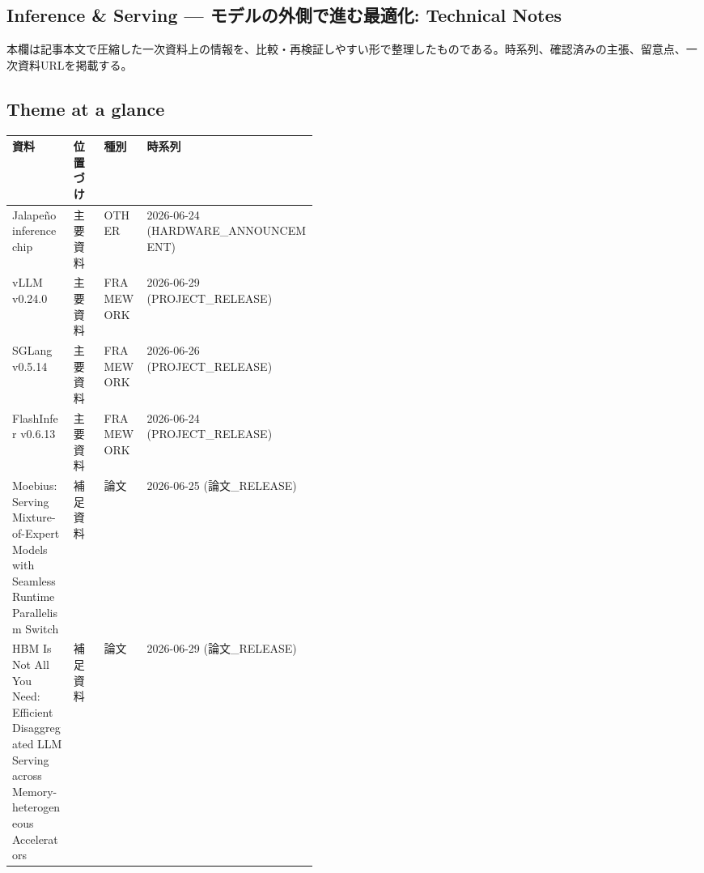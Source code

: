 \subsection*{Inference \& Serving — モデルの外側で進む最適化: Technical Notes}
本欄は記事本文で圧縮した一次資料上の情報を、比較・再検証しやすい形で整理したものである。時系列、確認済みの主張、留意点、一次資料URLを掲載する。
\medskip
\subsection*{Theme at a glance}
\begin{center}
\footnotesize
\begin{tabularx}{\linewidth}{@{}p{0.20\linewidth}p{0.10\linewidth}p{0.14\linewidth}X@{}}
\toprule
資料 & 位置づけ & 種別 & 時系列 \\
\midrule
Jalapeño inference chip & 主要資料 & OTHER & 2026-06-24 (HARDWARE\_ANNOUNCEMENT) \\
vLLM v0.24.0 & 主要資料 & FRAMEWORK & 2026-06-29 (PROJECT\_RELEASE) \\
SGLang v0.5.14 & 主要資料 & FRAMEWORK & 2026-06-26 (PROJECT\_RELEASE) \\
FlashInfer v0.6.13 & 主要資料 & FRAMEWORK & 2026-06-24 (PROJECT\_RELEASE) \\
Moebius: Serving Mixture-of-Expert Models with Seamless Runtime Parallelism Switch & 補足資料 & 論文 & 2026-06-25 (論文\_RELEASE) \\
HBM Is Not All You Need: Efficient Disaggregated LLM Serving across Memory-heterogeneous Accelerators & 補足資料 & 論文 & 2026-06-29 (論文\_RELEASE) \\
\bottomrule
\end{tabularx}
\end{center}
\normalsize

